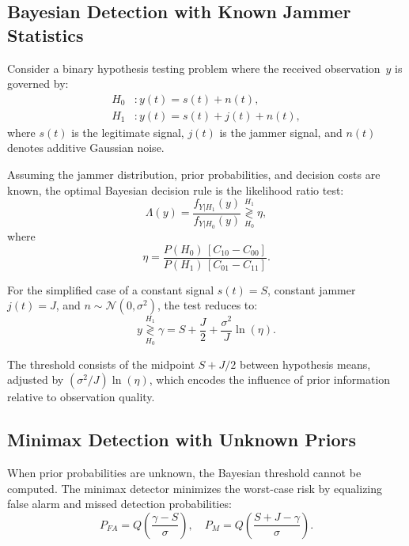 \documentclass[conference]{IEEEtran}
\begin{document}
\subsection{Bayesian Detection with Known Jammer Statistics}

Consider a binary hypothesis testing problem where the received observation~$y$ is governed by:
\begin{align}
H_0 &: y(t) = s(t) + n(t), \\
H_1 &: y(t) = s(t) + j(t) + n(t),
\end{align}
where $s(t)$ is the legitimate signal, $j(t)$ is the jammer signal, and $n(t)$ denotes additive Gaussian noise.

Assuming the jammer distribution, prior probabilities, and decision costs are known, the optimal Bayesian decision rule is the likelihood ratio test:
\begin{equation}
\Lambda(y) = \frac{f_{Y|H_1}(y)}{f_{Y|H_0}(y)} \underset{H_0}{\overset{H_1}{\gtrless}} \eta,
\end{equation}
where
\begin{equation}
\eta = \frac{P(H_0)\,[C_{10}-C_{00}]}{P(H_1)\,[C_{01}-C_{11}]}.
\end{equation}

For the simplified case of a constant signal $s(t)=S$, constant jammer $j(t)=J$, and $n \sim \mathcal{N}(0,\sigma^2)$, the test reduces to:
\begin{equation}
y \underset{H_0}{\overset{H_1}{\gtrless}} \gamma = S + \frac{J}{2} + \frac{\sigma^2}{J}\ln(\eta).
\end{equation}

The threshold consists of the midpoint $S+J/2$ between hypothesis means, adjusted by $(\sigma^2/J)\ln(\eta)$, which encodes the influence of prior information relative to observation quality.

\subsection{Minimax Detection with Unknown Priors}

When prior probabilities are unknown, the Bayesian threshold cannot be computed. The minimax detector minimizes the worst-case risk by equalizing false alarm and missed detection probabilities:
\begin{equation}
P_{FA} = Q\!\left(\frac{\gamma-S}{\sigma}\right), \quad P_M = Q\!\left(\frac{S+J-\gamma}{\sigma}\right).
\end{equation}
\end{document}
